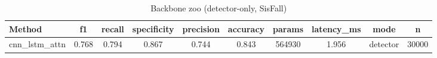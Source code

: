 \begin{table}[t]
\centering
\caption{Backbone zoo (detector-only, SisFall)}
\begin{tabular}{lccccccccc}
\toprule
Method & f1 & recall & specificity & precision & accuracy & params & latency_ms & mode & n \\
\midrule
cnn_lstm_attn & 0.768 & 0.794 & 0.867 & 0.744 & 0.843 & 564930 & 1.956 & detector & 30000 \\
\bottomrule
\end{tabular}
\end{table}